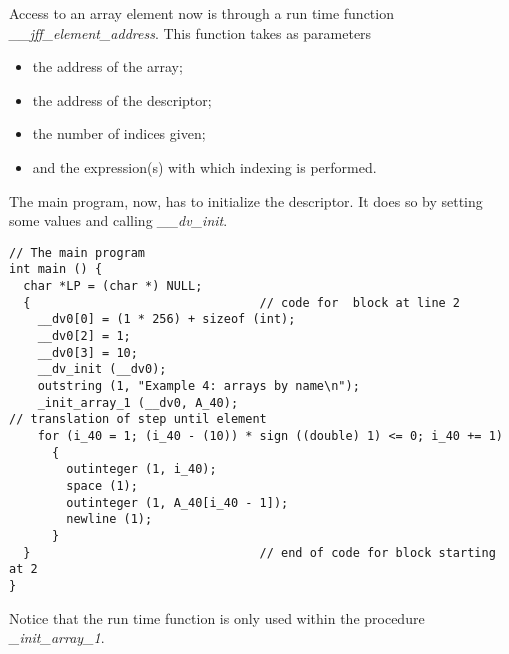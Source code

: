 \documentclass[11pt]{article}
\begin{document}
Access to an array element now is through a run time function
{\em \_\_jff\_element\_address}. This function takes as parameters
\begin{itemize}
\item the address of the array;
\item the address of the descriptor;
\item the number of indices given;
\item and the expression(s) with which indexing is performed.
\end{itemize}
The main program, now, has to initialize the descriptor. It does so
by setting some values and calling {\em \_\_dv\_init}.
{\footnotesize
\begin{verbatim}
// The main program
int main () {
  char *LP = (char *) NULL;
  {                                // code for  block at line 2 
    __dv0[0] = (1 * 256) + sizeof (int);
    __dv0[2] = 1;
    __dv0[3] = 10;
    __dv_init (__dv0);
    outstring (1, "Example 4: arrays by name\n");
    _init_array_1 (__dv0, A_40);
// translation of step until element
    for (i_40 = 1; (i_40 - (10)) * sign ((double) 1) <= 0; i_40 += 1)
      {
        outinteger (1, i_40);
        space (1);
        outinteger (1, A_40[i_40 - 1]);
        newline (1);
      }
  }                                // end of code for block starting at 2
}
\end{verbatim}
}
Notice that the run time function is only used within the
procedure {\em \_init\_array\_1}.
\end{document}

